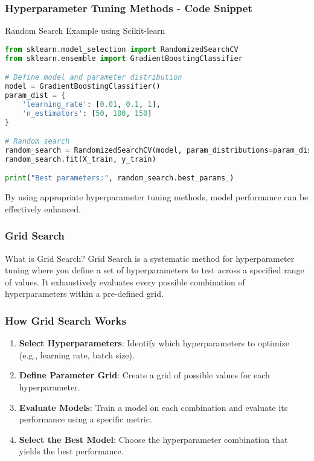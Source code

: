 \documentclass[aspectratio=169]{beamer}
\begin{document}
\begin{frame}[fragile]
    \frametitle{Hyperparameter Tuning Methods - Code Snippet}
    \begin{block}{Random Search Example using Scikit-learn}
        \begin{lstlisting}[language=Python]
from sklearn.model_selection import RandomizedSearchCV
from sklearn.ensemble import GradientBoostingClassifier

# Define model and parameter distribution
model = GradientBoostingClassifier()
param_dist = {
    'learning_rate': [0.01, 0.1, 1],
    'n_estimators': [50, 100, 150]
}

# Random search
random_search = RandomizedSearchCV(model, param_distributions=param_dist, n_iter=5, cv=5)
random_search.fit(X_train, y_train)

print("Best parameters:", random_search.best_params_)
        \end{lstlisting}
    \end{block}
    By using appropriate hyperparameter tuning methods, model performance can be effectively enhanced.
\end{frame}

\begin{frame}[fragile]
    \frametitle{Grid Search}
    \begin{block}{What is Grid Search?}
        Grid Search is a systematic method for hyperparameter tuning where you define a set of hyperparameters to test across a specified range of values. It exhaustively evaluates every possible combination of hyperparameters within a pre-defined grid.
    \end{block}
\end{frame}

\begin{frame}[fragile]
    \frametitle{How Grid Search Works}
    \begin{enumerate}
        \item \textbf{Select Hyperparameters}: Identify which hyperparameters to optimize (e.g., learning rate, batch size).
        \item \textbf{Define Parameter Grid}: Create a grid of possible values for each hyperparameter.
        \item \textbf{Evaluate Models}: Train a model on each combination and evaluate its performance using a specific metric.
        \item \textbf{Select the Best Model}: Choose the hyperparameter combination that yields the best performance.
    \end{enumerate}
\end{frame}
\end{document}
